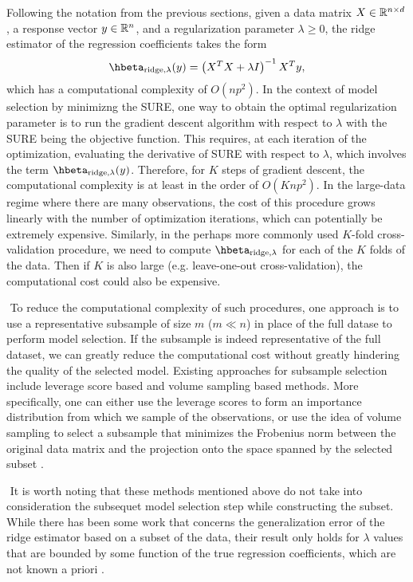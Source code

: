 Following the notation from the previous sections, given a data matrix $X\in\mathbb{R}^{n\times d}$, a response vector $y\in\mathbb{R}^n$, and a regularization parameter $\lambda\geq0$, the ridge estimator of the regression coefficients takes the form
\[
\hbeta_{\text{ridge}, \lambda}(y) = \left( X^TX + \lambda I \right)^{-1}X^Ty,
\]
which has a computational complexity of $O(np^2)$. In the context of model selection by minimizng the SURE, one way to obtain the optimal regularization parameter is to run the gradient descent algorithm with respect to $\lambda$ with the SURE being the objective function. This requires, at each iteration of the optimization, evaluating the derivative of SURE with respect to $\lambda$, which involves the term $\hbeta_{\text{ridge}, \lambda}(y)$. Therefore, for $K$ steps of gradient descent, the computational complexity is at least in the order of $O(Knp^2)$. In the large-data regime where there are many observations, the cost of this procedure grows linearly with the number of optimization iterations, which can potentially be extremely expensive. Similarly, in the perhaps more commonly used $K$-fold cross-validation procedure, we need to compute $\hbeta_{\text{ridge}, \lambda}$ for each of the $K$ folds of the data. Then if $K$ is also large (e.g. leave-one-out cross-validation), the computational cost could also be expensive.

$ $\newline
To reduce the computational complexity of such procedures, one approach is to use a representative subsample of size $m$ ($m\ll n$) in place of the full datase to perform model selection. If the subsample is indeed representative of the full dataset, we can greatly reduce the computational cost without greatly hindering the quality of the selected model. Existing approaches for subsample selection include leverage score based and volume sampling based methods. More specifically, one can either use the leverage scores to form an importance distribution from which we sample of the observations, or use the idea of volume sampling to select a subsample that minimizes the Frobenius norm between the original data matrix and the projection onto the space spanned by the selected subset \citep{ma2014statistical,avron2010blendenpik}.

$ $\newline
It is worth noting that these methods mentioned above do not take into consideration the subsequet model selection step while constructing the subset. While there has been some work that concerns the generalization error of the ridge estimator based on a subset of the data, their result only holds for $\lambda$ values that are bounded by some function of the true regression coefficients, which are not known a priori \citep{derezinski2017subsampling}.


